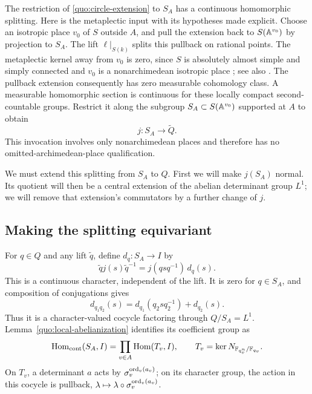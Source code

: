 The restriction of \eqref{quo:circle-extension} to $S_A$ has a
continuous homomorphic splitting.  Here is the metaplectic input with
its hypotheses made explicit.  Choose an isotropic place $v_0$ of
$S$ outside $A$, and pull the extension back to $S(\mathbb A^{v_0})$
by projection to $S_A$.  The lift $\ell|_{S(k)}$ splits this pullback
on rational points.  The metaplectic kernel away from $v_0$ is zero,
since $S$ is absolutely almost simple and simply connected and
$v_0$ is a nonarchimedean isotropic place
\cite[Theorem~3]{PRsurvey}; see also \cite{PRmetaplectic}.
The pullback extension consequently has zero measurable cohomology
class.  A measurable homomorphic section is continuous for these
locally compact second-countable groups.  Restrict it along the
subgroup $S_A\subset S(\mathbb A^{v_0})$ supported at $A$ to obtain
\begin{equation}\label{quo:local-section}
 j:S_A\longrightarrow\widetilde Q.
\end{equation}
This invocation involves only nonarchimedean places and therefore has
no omitted-archimedean-place qualification.

We must extend this splitting from $S_A$ to $Q$.  First we will make
$j(S_A)$ normal.  Its quotient will then be a central extension of
the abelian determinant group $L^1$; we will remove that extension's
commutators by a further change of $j$.

\subsection{Making the splitting equivariant}

For $q\in Q$ and any lift $\widetilde q$, define $d_q:S_A\to I$ by
\begin{equation}\label{quo:discrepancy}
 \widetilde q j(s)\widetilde q^{-1}
       =j(qsq^{-1})\,d_q(s).
\end{equation}
This is a continuous character, independent of the lift.  It is zero
for $q\in S_A$, and composition of conjugations gives
\[
 d_{q_1q_2}(s)=d_{q_1}(q_2sq_2^{-1})+d_{q_2}(s).
\]
Thus it is a character-valued cocycle factoring through
$Q/S_A=L^1$.  Lemma~\ref{quo:local-abelianization} identifies its
coefficient group as
\[
 \operatorname{Hom}_{\mathrm{cont}}(S_A,I)
       =\prod_{v\in A}\operatorname{Hom}(T_v,I),
 \qquad
 T_v=\ker N_{\mathbb F_{q_v^n}/\mathbb F_{q_v}}.
\]
On $T_v$, a determinant $a$ acts by $\sigma_v^{\operatorname{ord}_v(a_v)}$;
on its character group, the action in this cocycle is pullback,
$\lambda\mapsto\lambda\circ\sigma_v^{\operatorname{ord}_v(a_v)}$.

